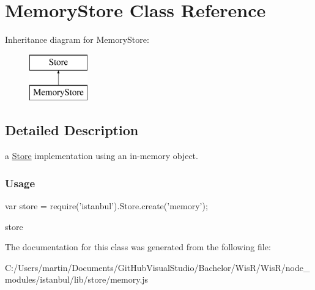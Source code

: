 \hypertarget{class_memory_store}{}\section{Memory\+Store Class Reference}
\label{class_memory_store}
Inheritance diagram for Memory\+Store\+:\begin{figure}[H]
\begin{center}
\leavevmode
\includegraphics[height=2.000000cm]{class_memory_store}
\end{center}
\end{figure}


\subsection{Detailed Description}
a {\ttfamily \hyperlink{class_store}{Store}} implementation using an in-\/memory object.

\subsubsection*{Usage }

\begin{DoxyVerb} var store = require('istanbul').Store.create('memory');
\end{DoxyVerb}


store  

The documentation for this class was generated from the following file\+:\begin{DoxyCompactItemize}
\item 
C\+:/\+Users/martin/\+Documents/\+Git\+Hub\+Visual\+Studio/\+Bachelor/\+Wis\+R/\+Wis\+R/node\+\_\+modules/istanbul/lib/store/memory.\+js\end{DoxyCompactItemize}
